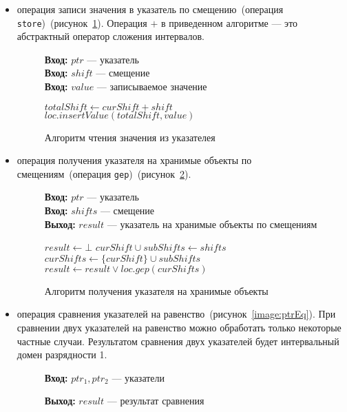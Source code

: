 \begin{itemize}
\item операция записи значения в указатель по смещению~(операция 
\texttt{store})~(рисунок~\ref{image:ptrStore}). Операция $+$ в приведенном
алгоритме --- это абстрактный оператор сложения интервалов.
\begin{figure}[h!]
\textbf{Вход:} $ptr$ --- указатель\\
\textbf{Вход:} $shift$ --- смещение\\
\textbf{Вход:} $value$ --- записываемое значение

\begin{algorithmic}[1]
        \State $totalShift \gets curShift + shift$
        \State $loc.insertValue(totalShift, value)$
    \EndFor
\EndFor
\end{algorithmic}
\caption{Алгоритм чтения значения из указателея}
\label{image:ptrStore}
\end{figure}

\item операция получения указателя на хранимые объекты по смещениям~(операция 
\texttt{gep})~(рисунок~\ref{image:ptrGep}).
\begin{figure}[h!]
\textbf{Вход:} $ptr$ --- указатель\\
\textbf{Вход:} $shifts$ --- смещение\\
\textbf{Выход:} $result$ --- указатель на хранимые объекты по смещениям

\begin{algorithmic}[1]
\State $result \gets \bot$
\State $curShift \cup subShifts \gets shifts$
        \State $curShifts \gets \{curShift\} \cup subShifts$
        \State $result \gets result \vee loc.gep(curShifts)$
    \EndFor
\EndFor
\end{algorithmic}
\caption{Алгоритм получения указателя на хранимые объекты}
\label{image:ptrGep}
\end{figure}

\item операция сравнения указателей на равенство~(рисунок~\ref{image:ptrEq}).
При сравнении двух указателей на равенство можно обработать только некоторые
частные случаи. Результатом сравнения двух указателей будет интервальный домен разрядности 1.
\begin{figure}[h!]
\textbf{Вход:} $ptr_1, ptr_2$ --- указатели

\textbf{Выход:} $result$ --- результат сравнения


\end{figure}
\end{itemize}
